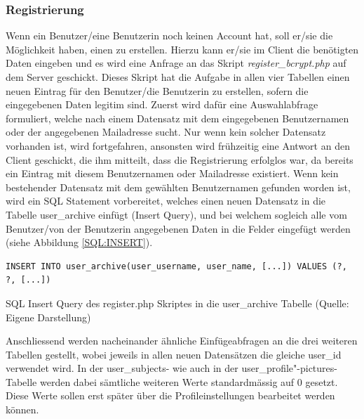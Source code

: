 \documentclass[../main.tex]{subfiles}
\begin{document}
	 
	 \subsubsection{Registrierung}
	 Wenn ein Benutzer/eine Benutzerin noch keinen Account hat, soll er/sie die Möglichkeit haben, einen zu erstellen. Hierzu kann er/sie im Client die benötigten Daten eingeben und es wird eine Anfrage an das Skript \emph{register\_bcrypt.php} auf dem Server geschickt. Dieses Skript hat die Aufgabe in allen vier Tabellen einen neuen Eintrag für den Benutzer/die Benutzerin zu erstellen, sofern die eingegebenen Daten legitim sind. Zuerst wird dafür eine Auswahlabfrage formuliert, welche nach einem Datensatz mit dem eingegebenen Benutzernamen oder der angegebenen Mailadresse sucht. Nur wenn kein solcher Datensatz vorhanden ist, wird fortgefahren, ansonsten wird frühzeitig eine Antwort an den Client geschickt, die ihm mitteilt, dass die Registrierung erfolglos war, da bereits ein Eintrag mit diesem Benutzernamen oder Mailadresse existiert. Wenn kein bestehender Datensatz mit dem gewählten Benutzernamen gefunden worden ist, wird ein SQL Statement vorbereitet, welches einen neuen Datensatz in die Tabelle user\_archive einfügt (Insert Query), und bei welchem sogleich alle vom Benutzer/von der Benutzerin angegebenen Daten in die Felder eingefügt werden (siehe Abbildung \ref{SQL:INSERT}).
	 
	 \begin{code} 
	 	\begin{center}
	 		\begin{verbatim}
INSERT INTO user_archive(user_username, user_name, [...]) VALUES (?, ?, [...])
	 		\end{verbatim}
	 		\caption{SQL Insert Query des register.php Skriptes in die user\_archive Tabelle (Quelle: Eigene Darstellung)}\label{SQL:INSERT}
	 	\end{center}
	 \end{code}
	 
	 \sloppy
	 Anschliessend werden nacheinander ähnliche Einfügeabfragen an die drei weiteren Tabellen gestellt, wobei jeweils in allen neuen Datensätzen die gleiche user\_id verwendet wird. In der user\_subjects- wie auch in der user\_profile"-pictures-Tabelle werden dabei sämtliche weiteren Werte standardmässig auf 0 gesetzt. Diese Werte sollen erst später über die Profileinstellungen bearbeitet werden können. 
	 \fussy
	 
\end{document}
